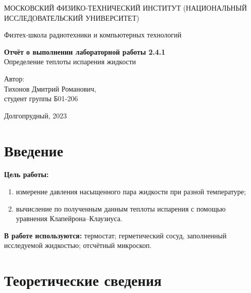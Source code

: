 \documentclass[a4paper, 12pt]{article}
\begin{document}
    \begin{titlepage}
	\begin{center}
            {\large МОСКОВСКИЙ ФИЗИКО-ТЕХНИЧЕСКИЙ ИНСТИТУТ (НАЦИОНАЛЬНЫЙ       ИССЛЕДОВАТЕЛЬСКИЙ УНИВЕРСИТЕТ)}
	\end{center}
 
	\begin{center}
		{\large Физтех-школа радиотехники и компьютерных технологий}
	\end{center}
	
	\vspace{8cm}
	{\LARGE
		\begin{center}
                {\bf Отчёт о выполнении лабораторной работы 2.4.1}\\
                Определение теплоты испарения жидкости
		\end{center}
	}
	\vspace{5cm}
	\begin{flushright}
		{\Large Автор:\\ Тихонов Дмитрий Романович, \\
			\vspace{0.2cm}
			студент группы Б01-206}
	\end{flushright}
	\vspace{5cm}
	\begin{center}
		\Large Долгопрудный, 2023
	\end{center}
    \end{titlepage}

    \section*{Введение}

    \noindent \textbf{Цель работы:}  
    \begin{enumerate}
        \item измерение давления насыщенного пара жидкости при разной температуре;
        \item вычисление по полученным данным теплоты испарения с помощью уравнения Клапейрона–Клаузиуса.
    \end{enumerate}

    \noindent \textbf{В работе используются:} термостат; герметический сосуд, заполненный исследуемой жидкостью; отсчётный микроскоп.
    
    \section*{Теоретические сведения}
\end{document}
